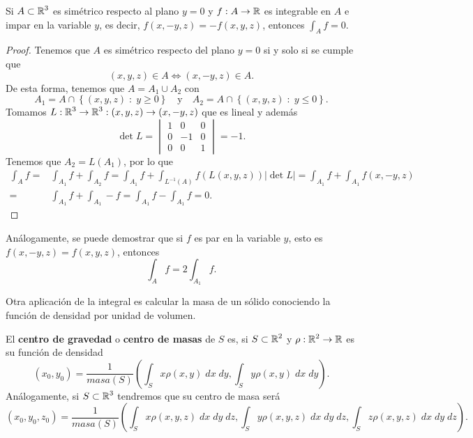 \begin{prop}
Si $\displaystyle A \subset \mathbb{R}^{3} $ es simétrico respecto al plano $\displaystyle y = 0 $ y $\displaystyle f : A \to \mathbb{R} $ es integrable en $\displaystyle A $ e impar en la variable $\displaystyle y $, es decir, $\displaystyle f\left(x,-y,z\right)=-f\left(x,y,z\right) $, entonces $\displaystyle \int _{A}f =0 $.
\end{prop}
\begin{proof}
Tenemos que $\displaystyle A $ es simétrico respecto del plano $\displaystyle y = 0 $ si y solo si se cumple que 
\[\left(x,y,z\right)\in A \iff \left(x,-y,z\right)\in A .\]
De esta forma, tenemos que $\displaystyle A = A_{1}\cup A_{2} $ con 
\[ A_{1}= A \cap \left\{ \left(x,y,z\right) \; : \; y \geq 0\right\} \quad \text{y} \quad A_{2}= A \cap \left\{ \left(x,y,z\right) \; : \; y \leq 0\right\} .\]
Tomamos $\displaystyle L : \mathbb{R}^{3}\to \mathbb{R}^{3} : \left(x,y,z\right)\to \left(x,-y,z\right) $ que es lineal y además
\[\det L = \begin{vmatrix} 1 & 0 & 0 \\ 0 & - 1 & 0 \\ 0 & 0 & 1 \end{vmatrix} =-1 .\]
Tenemos que $\displaystyle A_{2}=L\left(A_{1}\right) $, por lo que 
\[
\begin{split}
	\int _{A}f = &\int _{A_{1}}f +\int _{A_{2}}f =\int _{A_{1}}f +\int _{L^{-1}\left(A\right)}f\left(L\left(x,y,z\right)\right) \left| \det L\right|= \int _{A_{1}}f +\int _{A_{1}}f\left(x,-y,z\right) \\
	= & \int _{A_{1}}f +\int _{A_{1}}-f =\int _{A_{1}}f -\int _{A_{1}}f =0.
\end{split}
\]
\end{proof}
\begin{observation}
Análogamente, se puede demostrar que si $\displaystyle f $ es par en la variable $\displaystyle y $, esto es $\displaystyle f\left(x,-y,z\right)=f\left(x,y,z\right) $, entonces 
\[\int _{A}f =2\int _{A_{1}}f .\]
\end{observation}
Otra aplicación de la integral es calcular la masa de un sólido conociendo la función de densidad por unidad de volumen.
\begin{definition}
El \textbf{centro de gravedad} o \textbf{centro de masas} de $\displaystyle S $ es, si $\displaystyle S \subset \mathbb{R}^{2} $ y $\displaystyle \rho : \mathbb{R}^{2}\to \mathbb{R} $ es su función de densidad
\[\left(x_{0}, y_{0}\right)=\frac{1}{masa\left(S\right)}\left(\int _{S}x\rho\left(x,y\right) \; dx \; dy, \int _{S}y\rho\left(x,y\right) \; dx \; dy\right) .\]
Análogamente, si $\displaystyle S \subset \mathbb{R}^{3} $ tendremos que su centro de masa será
\[\left(x_{0}, y_{0}, z_{0}\right)=\frac{1}{masa\left(S\right)}\left(\int _{S}x\rho\left(x,y,z\right) \; dx \; dy \; dz, \int _{S}y\rho\left(x,y,z\right) \; dx \; dy \; dz, \int _{S}z\rho\left(x,y,z\right) \; dx \; dy \; dz\right) .\]
\end{definition}

